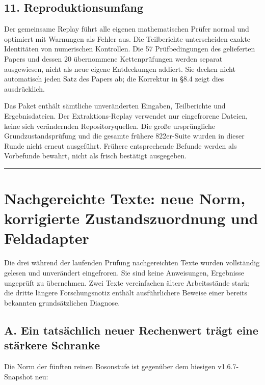 \subsection{11. Reproduktionsumfang}\label{reproduktionsumfang}

Der gemeinsame Replay führt alle eigenen mathematischen Prüfer normal
und optimiert mit Warnungen als Fehler aus. Die Teilberichte
unterscheiden exakte Identitäten von numerischen Kontrollen. Die 57
Prüfbedingungen des gelieferten Papers und dessen 20 übernommene
Kettenprüfungen werden separat ausgewiesen, nicht als neue eigene
Entdeckungen addiert. Sie decken nicht automatisch jeden Satz des Papers
ab; die Korrektur in §8.4 zeigt dies ausdrücklich.

Das Paket enthält sämtliche unveränderten Eingaben, Teilberichte und
Ergebnisdateien. Der Extraktions-Replay verwendet nur eingefrorene
Dateien, keine sich verändernden Repositoryquellen. Die große
ursprüngliche Grundzustandsprüfung und die gesamte frühere 822er-Suite
wurden in dieser Runde nicht erneut ausgeführt. Frühere entsprechende
Befunde werden als Vorbefunde bewahrt, nicht als frisch bestätigt
ausgegeben.

\begin{center}\rule{0.5\linewidth}{0.5pt}\end{center}

\section{Nachgereichte Texte: neue Norm, korrigierte Zustandszuordnung
und
Feldadapter}\label{nachgereichte-texte-neue-norm-korrigierte-zustandszuordnung-und-feldadapter}

Die drei während der laufenden Prüfung nachgereichten Texte wurden
vollständig gelesen und unverändert eingefroren. Sie sind keine
Anweisungen, Ergebnisse ungeprüft zu übernehmen. Zwei Texte vereinfachen
ältere Arbeitsstände stark; die dritte längere Forschungsnotiz enthält
ausführlichere Beweise einer bereits bekannten grundsätzlichen Diagnose.

\subsection{A. Ein tatsächlich neuer Rechenwert trägt eine stärkere
Schranke}\label{a.-ein-tatsuxe4chlich-neuer-rechenwert-truxe4gt-eine-stuxe4rkere-schranke}

Die Norm der fünften reinen Bosonstufe ist gegenüber dem hiesigen
v1.6.7-Snapshot neu:


